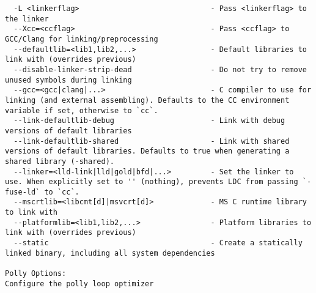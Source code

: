 \documentclass{studrep}
\begin{document}
\begin{verbatim}
  -L <linkerflag>                              - Pass <linkerflag> to the linker
  --Xcc=<ccflag>                               - Pass <ccflag> to GCC/Clang for linking/preprocessing
  --defaultlib=<lib1,lib2,...>                 - Default libraries to link with (overrides previous)
  --disable-linker-strip-dead                  - Do not try to remove unused symbols during linking
  --gcc=<gcc|clang|...>                        - C compiler to use for linking (and external assembling). Defaults to the CC environment variable if set, otherwise to `cc`.
  --link-defaultlib-debug                      - Link with debug versions of default libraries
  --link-defaultlib-shared                     - Link with shared versions of default libraries. Defaults to true when generating a shared library (-shared).
  --linker=<lld-link|lld|gold|bfd|...>         - Set the linker to use. When explicitly set to '' (nothing), prevents LDC from passing `-fuse-ld` to `cc`.
  --mscrtlib=<libcmt[d]|msvcrt[d]>             - MS C runtime library to link with
  --platformlib=<lib1,lib2,...>                - Platform libraries to link with (overrides previous)
  --static                                     - Create a statically linked binary, including all system dependencies

Polly Options:
Configure the polly loop optimizer


\end{verbatim}
\end{document}
